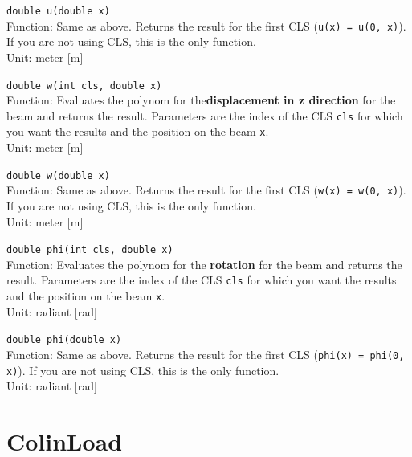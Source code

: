 \begin{trivlist}
\begin{trivlist}
		\item[] \texttt{double u(double x)} \\Function: Same as above. Returns the result for the first CLS (\texttt{u(x) = u(0, x)}). If you are not using CLS, this is the only function.\\Unit: meter [m]
		\item[] \texttt{double w(int cls, double x)} \\Function: Evaluates the polynom for the\textbf{displacement in z direction} for the beam and returns the result. Parameters are the index of the CLS \texttt{cls} for which you want the results and the position on the beam \texttt{x}. \\Unit: meter [m]
		\item[] \texttt{double w(double x)} \\Function: Same as above. Returns the result for the first CLS (\texttt{w(x) = w(0, x)}). If you are not using CLS, this is the only function.\\Unit: meter [m]
		\item[] \texttt{double phi(int cls, double x)} \\Function: Evaluates the polynom for the \textbf{rotation} for the beam and returns the result. Parameters are the index of the CLS \texttt{cls} for which you want the results and the position on the beam \texttt{x}. \\Unit: radiant [rad]
		\item[] \texttt{double phi(double x)} \\Function: Same as above. Returns the result for the first CLS (\texttt{phi(x) = phi(0, x)}). If you are not using CLS, this is the only function.\\Unit: radiant [rad]
	
\end{trivlist}


\section{ColinLoad}
\label{sec:jsColinLoad}


\end{trivlist}
